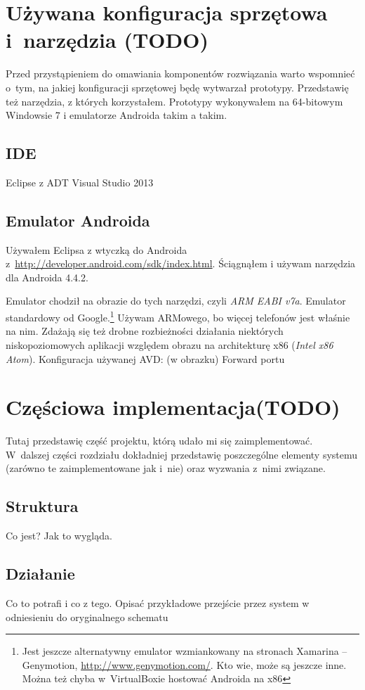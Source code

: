 \section{Używana konfiguracja sprzętowa i~narzędzia (TODO)}
Przed przystąpieniem do omawiania komponentów rozwiązania warto wspomnieć o~tym, na jakiej konfiguracji sprzętowej będę wytwarzał prototypy. Przedstawię też narzędzia, z których korzystałem.
Prototypy wykonywałem na 64-bitowym Windowsie 7 i emulatorze Androida takim a takim.

\subsection{IDE}
Eclipse z ADT
Visual Studio 2013


\subsection{Emulator Androida}
\label{android-emulator}
Używałem Eclipsa z wtyczką do Androida z~\url{http://developer.android.com/sdk/index.html}.
Ściągnąłem i używam narzędzia dla Androida 4.4.2.

Emulator chodził na obrazie do tych narzędzi, czyli \emph{ARM EABI v7a}. Emulator standardowy od Google.\footnote{Jest jeszcze alternatywny emulator wzmiankowany na stronach Xamarina -- Genymotion, \url{http://www.genymotion.com/}. Kto wie, może są jeszcze inne. Można też chyba w~VirtualBoxie hostować Androida na x86}
Używam ARMowego, bo więcej telefonów jest właśnie na nim. Zdażają się też drobne rozbieżności działania niektórych niskopoziomowych aplikacji względem obrazu na architekturę x86 (\emph{Intel x86 Atom}).
Konfiguracja używanej AVD: (w obrazku)
Forward portu



\section{Częściowa implementacja(TODO)}
Tutaj przedstawię część projektu, którą udało mi się zaimplementować. W~dalszej części rozdziału dokładniej przedstawię poszczególne elementy systemu (zarówno te zaimplementowane jak i~nie) oraz wyzwania z~nimi związane.

\subsection{Struktura}
Co jest? Jak to wygląda.


\subsection{Działanie}
Co to potrafi i co z tego.
Opisać przykładowe przejście przez system w odniesieniu do oryginalnego schematu


